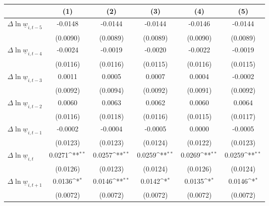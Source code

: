 {
\def\sym#1{\ifmmode^{#1}\else\(^{#1}\)\fi}
\begin{tabular}{l*{5}{c}}
\hline\hline
          &\multicolumn{1}{c}{(1)}         &\multicolumn{1}{c}{(2)}         &\multicolumn{1}{c}{(3)}         &\multicolumn{1}{c}{(4)}         &\multicolumn{1}{c}{(5)}         \\
\hline
$\Delta \ln \underline{w}_{i,t-5}$&  -0.0148         &  -0.0144         &  -0.0144         &  -0.0146         &  -0.0144         \\
          & (0.0090)         & (0.0089)         & (0.0089)         & (0.0090)         & (0.0089)         \\
[1em]
$\Delta \ln \underline{w}_{i,t-4}$&  -0.0024         &  -0.0019         &  -0.0020         &  -0.0022         &  -0.0019         \\
          & (0.0116)         & (0.0116)         & (0.0115)         & (0.0116)         & (0.0115)         \\
[1em]
$\Delta \ln \underline{w}_{i,t-3}$&   0.0011         &   0.0005         &   0.0007         &   0.0004         &  -0.0002         \\
          & (0.0092)         & (0.0094)         & (0.0092)         & (0.0091)         & (0.0092)         \\
[1em]
$\Delta \ln \underline{w}_{i,t-2}$&   0.0060         &   0.0063         &   0.0062         &   0.0060         &   0.0064         \\
          & (0.0116)         & (0.0118)         & (0.0116)         & (0.0115)         & (0.0117)         \\
[1em]
$\Delta \ln \underline{w}_{i,t-1}$&  -0.0002         &  -0.0004         &  -0.0005         &   0.0000         &  -0.0005         \\
          & (0.0123)         & (0.0123)         & (0.0124)         & (0.0122)         & (0.0123)         \\
[1em]
$\Delta \ln \underline{w}_{i,t}$&   0.0271\sym{**} &   0.0257\sym{**} &   0.0259\sym{**} &   0.0269\sym{**} &   0.0259\sym{**} \\
          & (0.0126)         & (0.0123)         & (0.0124)         & (0.0126)         & (0.0124)         \\
[1em]
$\Delta \ln \underline{w}_{i,t+1}$&   0.0136\sym{*}  &   0.0146\sym{**} &   0.0142\sym{*}  &   0.0135\sym{*}  &   0.0146\sym{*}  \\
          & (0.0072)         & (0.0072)         & (0.0072)         & (0.0072)         & (0.0072)         \\

\end{tabular}}
